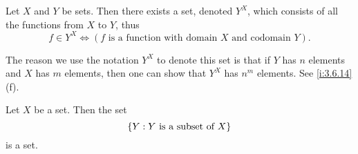 \begin{ax}\label{i:3.10}
  Let \(X\) and \(Y\) be sets.
  Then there exists a set, denoted \(Y^X\), which consists of all the functions from \(X\) to \(Y\), thus
  \[
    f \in Y^X \iff (f \text{ is a function with domain } X \text{ and codomain } Y).
  \]
\end{ax}

\begin{note}
  The reason we use the notation \(Y^X\) to denote this set is that if \(Y\) has \(n\) elements and \(X\) has \(m\) elements, then one can show that \(Y^X\) has \(n^m\) elements.
  See \cref{i:3.6.14}(f).
\end{note}

\setcounter{thm}{8}
\begin{lem}\label{i:3.4.9}
  Let \(X\) be a set.
  Then the set
  \[
    \left\lbrace Y : Y \text{ is a subset of } X\right\rbrace
  \]
  is a set.
\end{lem}

